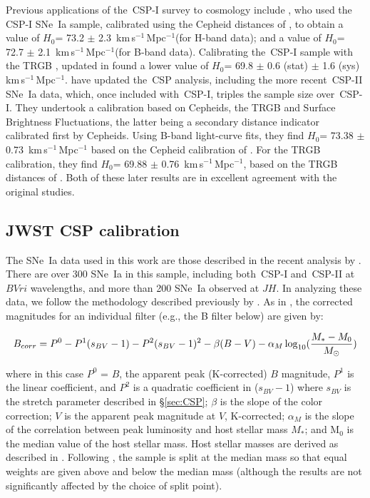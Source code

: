 \documentclass[12pt,modern]{aastex631}
\newcommand{\csp}{\,CSP\xspace}
\newcommand{\cspi}{\,CSP-I\xspace}
\newcommand{\cspii}{\,CSP-II\xspace}
\newcommand{\ho}{$H_{0}$\xspace}
\newcommand{\hounits}{\,km\,s$^{-1}$\,Mpc$^{-1}$\xspace}
\newcommand{\sne}{SNe~Ia\xspace}
\begin{document}
Previous applications of the \cspi survey to cosmology include \cite{burns_2018}, who used the \cspi \sne sample, calibrated using the Cepheid distances of \cite{riess_2016}, to obtain a value of \ho = 73.2 $\pm$ 2.3 \hounits (for H-band data); and a value of \ho = 72.7 $\pm$ 2.1 \hounits (for B-band data). Calibrating the \cspi sample with the TRGB \citep{freedman_2019}, updated in \citep{freedman_2020, freedman_2021} found a lower value of \ho = 69.8 $\pm $ 0.6 (stat) $\pm$ 1.6 (sys) \hounits.  \cite{uddin_2024} have updated the \csp analysis, including the more recent \cspii \sne data, which, once included with \cspi, triples the sample size over \cspi. They undertook a calibration based on Cepheids, the TRGB and Surface Brightness Fluctuations, the latter being a secondary distance indicator calibrated first by Cepheids. Using B-band light-curve fits, they find \ho = 73.38 $\pm$ 0.73 \hounits based on the Cepheid calibration of \cite{riess_2022}. For the TRGB calibration, they find \ho = 69.88 $\pm$ 0.76 \hounits, based on the TRGB distances of  \cite{freedman_2019}. Both of these later results are in excellent agreement with the original studies. 

\subsection{JWST CSP calibration}
\label{sec:jwstcsp}

The \sne data used in this work are those described in the recent analysis by \cite{uddin_2024}. There are over 300 \sne in this 
sample, including both \cspi and \cspii at $BVri$ wavelengths, and more than 200 \sne observed at $JH$. In analyzing these data, we follow the methodology described previously by \cite{burns_2018, freedman_2019, uddin_2024}.
As in \citeauthor{burns_2018}, the corrected magnitudes for an individual filter (e.g., the B filter below) are given by:

\begin{equation}
\label{eq:m_Tripp}
B_{corr}  =  P^0 - P^1(s_{BV}-1) - P^{2}(s_{BV}-1)^2 - \beta(B-V) - 
       \alpha_M\log_{10}({M_*-M_0\over M_\odot})
\end{equation}

\noindent
where in this case $P^0$ = $B$, the apparent peak (K-corrected) $B$ magnitude, $P^1$ is the linear coefficient, and $P^2$ is a quadratic coefficient in ($s_{BV}-1$) where $s_{BV}$ is the stretch parameter described in \S\ref{sec:CSP}; $\beta$ is the slope of the color correction; $V$ is the apparent peak magnitude at $V$, K-corrected; $\alpha_M$ is the slope of the correlation between peak luminosity and host stellar mass $M_*$; and M$_0$ is the median value of the host stellar mass. Host stellar masses are derived as described in \cite{uddin_2024}. Following \citeauthor{uddin_2024}, the sample is split at the median mass so that equal weights are given above and below the median mass (although the results are not significantly affected by the choice of split point). 
\end{document}
